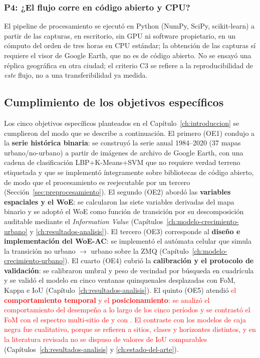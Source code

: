 \subsubsection{P4: ¿El flujo corre en código abierto y CPU?}

El pipeline de procesamiento se ejecutó en Python (NumPy, SciPy, scikit-learn) a partir de las capturas, en escritorio, sin GPU ni software propietario, en un cómputo del orden de tres horas en CPU estándar; la obtención de las capturas sí requiere el visor de Google Earth, que no es de código abierto. No se ensayó una réplica geográfica en otra ciudad; el criterio C3 se refiere a la reproducibilidad de \emph{este} flujo, no a una transferibilidad ya medida.

\subsection{Cumplimiento de los objetivos específicos}

Los cinco objetivos específicos planteados en el Capítulo~\ref{ch:introduccion} se cumplieron del modo que se describe a continuación. El primero (OE1) condujo a la \textbf{serie histórica binaria}: se construyó la serie anual 1984--2020 (37 mapas urbano/no-urbano) a partir de imágenes de archivo de Google Earth, con una cadena de clasificación LBP+K-Means+SVM que no requiere verdad terreno etiquetada y que se implementó íntegramente sobre bibliotecas de código abierto, de modo que el procesamiento es reejecutable por un tercero (Sección~\ref{sec:preprocesamiento}). El segundo (OE2) abordó las \textbf{variables espaciales y el WoE}: se calcularon las siete variables derivadas del mapa binario y se adoptó el WoE como función de transición por su descomposición auditable mediante el \textit{Information Value} (Capítulos~\ref{ch:modelo-crecimiento-urbano} y \ref{ch:resultados-analisis}). El tercero (OE3) corresponde al \textbf{diseño e implementación del WoE-AC}: se implementó el autómata celular que simula la transición no urbano $\rightarrow$ urbano sobre la ZMQ (Capítulo~\ref{ch:modelo-crecimiento-urbano}). El cuarto (OE4) cubrió la \textbf{calibración y el protocolo de validación}: se calibraron umbral y peso de vecindad por búsqueda en cuadrícula y se validó el modelo en cinco ventanas quinquenales desplazadas con FoM, Kappa e IoU (Capítulo~\ref{ch:resultados-analisis}). El quinto (OE5) atendió \textcolor{red}{el \textbf{comportamiento temporal} y el \textbf{posicionamiento}: se analizó el comportamiento del desempeño a lo largo de los cinco períodos y se contrastó el FoM con el espectro multi-sitio de \textcite{pontius2008comparing} y con \textcite{Tang2024}. El contraste con los modelos de caja negra fue cualitativo, porque se refieren a sitios, clases y horizontes distintos, y en la literatura revisada no se dispuso de valores de IoU comparables} (Capítulos~\ref{ch:resultados-analisis} y \ref{ch:estado-del-arte}).


